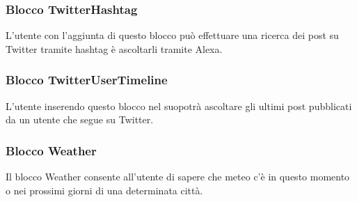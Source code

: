 \subsubsection{Blocco TwitterHashtag}
L'utente con l'aggiunta di questo blocco può effettuare una ricerca dei post su Twitter tramite hashtag è ascoltarli tramite Alexa.

\subsubsection{Blocco TwitterUserTimeline}
L'utente inserendo questo blocco nel suopotrà ascoltare gli ultimi post pubblicati da un utente che segue su Twitter.

\subsubsection{Blocco Weather}
Il blocco Weather consente all'utente di sapere che meteo c'è in questo momento o nei prossimi giorni di una determinata città.
\newpage
